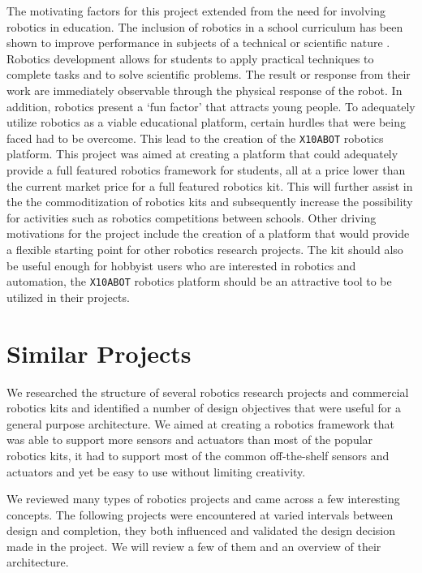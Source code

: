 The motivating factors for this project extended from the need for involving
robotics in education. The  inclusion of robotics in a school curriculum has been
shown to improve performance in subjects of a technical or scientific nature \parencite{rbot}. 
Robotics development
allows for students to apply practical techniques to complete tasks and 
to solve scientific problems. The result or response from their work are
immediately observable through the physical response of the robot. In addition,
robotics  present a `fun factor' that attracts young people.
To adequately utilize robotics as a viable educational platform, certain hurdles 
that were being faced had to be overcome. This lead to the creation of the \texttt{X10ABOT} robotics
platform. This project was aimed at creating a platform that could 
adequately provide a full featured robotics framework for students, all at a
price lower than the current market price for a full featured robotics kit.
This will further assist in the the commoditization of robotics kits and subsequently
increase the possibility for activities such as robotics competitions between schools.
Other driving motivations for the project include the creation of a platform that
would provide a flexible starting point for other robotics research projects. The kit
should also be useful enough for hobbyist users who are interested in robotics
and automation, the \texttt{X10ABOT} robotics platform should be an attractive tool to be utilized in their projects.

\section{Similar Projects} %
\label{sec:similar}
We researched the structure of several robotics research projects and commercial robotics kits and identified a number of design objectives that were useful for a general purpose architecture. We aimed at creating a robotics framework that was able to support more sensors and actuators than most of the popular robotics kits, it had to support most of the common off-the-shelf sensors and actuators and yet be easy to use without limiting creativity. 

We reviewed many types of robotics projects and came across a few interesting concepts. The following projects were encountered at varied intervals between design and completion, they both influenced and validated the design decision made in the \xten project. We will review a few of them and an overview of their architecture. 

